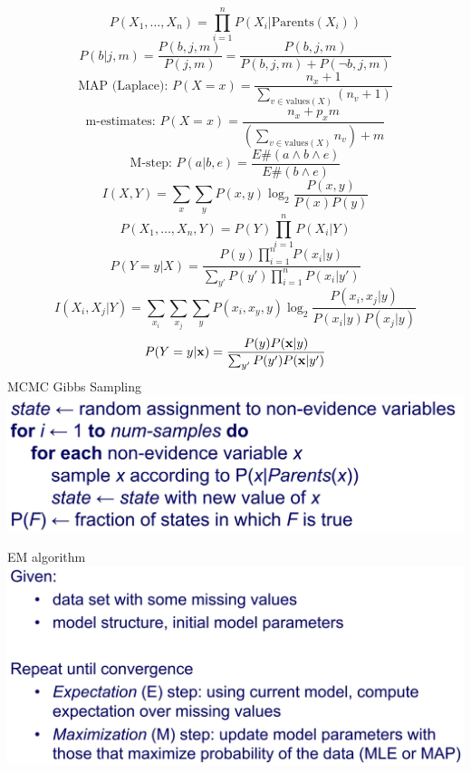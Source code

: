 \documentclass[10pt,landscape]{article}
\begin{document}
\begin{multicols}{4}
    \begin{equation*}
        P(X_1, \dots,X_n) = \prod_{i=1}^n P(X_i | \text{Parents}(X_i))
    \end{equation*}
    \begin{equation*}
        P(b|j,m) = \frac{P(b,j,m)}{P(j,m)} = \frac{P(b,j,m)}{P(b,j,m) + P(\neg b,j,m)}
    \end{equation*}
    \begin{equation*}
        \text{MAP (Laplace): } P(X=x) = \frac{n_x+1}{\sum_{v \in \text{values}(X)} (n_v+1)}
    \end{equation*}
    \begin{equation*}
        \text{m-estimates: } P(X=x) = \frac{n_x+p_xm}{\left(\sum_{v \in \text{values}(X)} n_v \right) + m}
    \end{equation*}
    \begin{equation*}
        \text{M-step: } P(a|b,e) = \frac{E\#(a \wedge b \wedge e)}{E\#( b \wedge e)}
    \end{equation*}
    \begin{equation*}
        I(X,Y) = \sum_{x} \sum_{y} P(x,y) \log_2 \frac{P(x,y)}{P(x)P(y)}
    \end{equation*}
    \begin{equation*}
        P(X_1,\dots,X_n,Y) = P(Y) \prod_{i=1}^n P(X_i|Y)
    \end{equation*}
    \begin{equation*}
        P(Y=y|X) = \frac{P(y)\prod_{i=1}^n P(x_i|y)}{\sum_{y'} P(y')\prod_{i=1}^n P(x_i|y')}
    \end{equation*}
    \begin{equation*}
        I(X_i,X_j|Y) = \sum_{x_i} \sum_{x_j} \sum_{y}  P(x_i,x_y,y) \log_2 \frac{P(x_i,x_j|y)}{P(x_i|y)P(x_j|y)}
    \end{equation*}
    \begin{equation*}
        P(Y=y|\bold{x}) = \frac{P(y)P(\bold{x}|y)}{\sum_{y'}P(y')P(\bold{x}|y')}
    \end{equation*}
    MCMC Gibbs Sampling
    \includegraphics[width=0.7\linewidth]{snips/08_mcmc-gibbs.jpg}

    EM algorithm
    \includegraphics[width=0.8\linewidth]{snips/09_EM-bayes-net.jpg}
    

\end{multicols}
\end{document}
